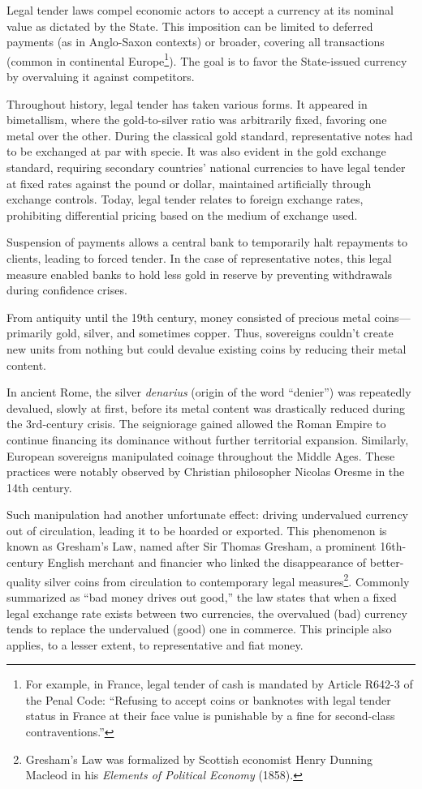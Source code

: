 \documentclass[
  a5paper,
  smalldemyvopaper,10pt,twoside,onecolumn,openright,extrafontsizes,hidelinks]{memoir}
\begin{document}
Legal tender laws compel economic actors to accept a currency at its
nominal value as dictated by the State. This imposition can be limited
to deferred payments (as in Anglo-Saxon contexts) or broader, covering
all transactions (common in continental Europe\footnote{For example, in
  France, legal tender of cash is mandated by Article R642-3 of the
  Penal Code: ``Refusing to accept coins or banknotes with legal tender
  status in France at their face value is punishable by a fine for
  second-class contraventions.''}). The goal is to favor the
State-issued currency by overvaluing it against competitors.

Throughout history, legal tender has taken various forms. It appeared in
bimetallism, where the gold-to-silver ratio was arbitrarily fixed,
favoring one metal over the other. During the classical gold standard,
representative notes had to be exchanged at par with specie. It was also
evident in the gold exchange standard, requiring secondary countries'
national currencies to have legal tender at fixed rates against the
pound or dollar, maintained artificially through exchange controls.
Today, legal tender relates to foreign exchange rates, prohibiting
differential pricing based on the medium of exchange used.

Suspension of payments allows a central bank to temporarily halt
repayments to clients, leading to forced tender. In the case of
representative notes, this legal measure enabled banks to hold less gold
in reserve by preventing withdrawals during confidence crises.

From antiquity until the 19th century, money consisted of precious metal
coins---primarily gold, silver, and sometimes copper. Thus, sovereigns
couldn't create new units from nothing but could devalue existing coins
by reducing their metal content.

In ancient Rome, the silver \emph{denarius} (origin of the word
``denier'') was repeatedly devalued, slowly at first, before its metal
content was drastically reduced during the 3rd-century crisis. The
seigniorage gained allowed the Roman Empire to continue financing its
dominance without further territorial expansion. Similarly, European
sovereigns manipulated coinage throughout the Middle Ages. These
practices were notably observed by Christian philosopher Nicolas Oresme
in the 14th century.

Such manipulation had another unfortunate effect: driving undervalued
currency out of circulation, leading it to be hoarded or exported. This
phenomenon is known as Gresham's Law, named after Sir Thomas Gresham, a
prominent 16th-century English merchant and financier who linked the
disappearance of better-quality silver coins from circulation to
contemporary legal measures\footnote{Gresham's Law was formalized by
  Scottish economist Henry Dunning Macleod in his \emph{Elements of
  Political Economy} (1858).}. Commonly summarized as ``bad money drives
out good,'' the law states that when a fixed legal exchange rate exists
between two currencies, the overvalued (bad) currency tends to replace
the undervalued (good) one in commerce. This principle also applies, to
a lesser extent, to representative and fiat money.
\end{document}
